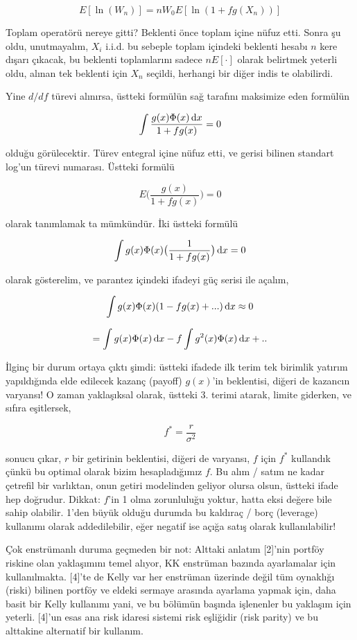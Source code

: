\documentclass[12pt,fleqn]{article}\usepackage{../../common}
\begin{document}
$$ E[\ln(W_n)] = n W_0 E[\ln (1+fg(X_n))]  $$

Toplam operatörü nereye gitti? Beklenti önce toplam içine nüfuz etti. Sonra
şu oldu, unutmayalım, $X_i$ i.i.d. bu sebeple toplam içindeki beklenti
hesabı $n$ kere dışarı çıkacak, bu beklenti toplamlarını sadece $n
E[\cdot]$ olarak belirtmek yeterli oldu, alınan tek beklenti için $X_n$
seçildi, herhangi bir diğer indis te olabilirdi.

Yine $d/df$ türevi alınırsa, üstteki formülün sağ tarafını maksimize eden
formülün 

$$ \int \frac{g(x) \Phi(x) \,\mathrm{d} x}{1 + fg(x)} = 0$$

olduğu görülecektir. Türev entegral içine nüfuz etti, ve gerisi bilinen
standart log'un türevi numarası. Üstteki formülü 

$$ E \bigg( \frac{g(x)}{1+fg(x)} \bigg) = 0$$

olarak tanımlamak ta mümkündür. İki üstteki formülü 

$$ \int g(x) \Phi(x) \big(\frac{1}{1 + fg(x)} \big) \,\mathrm{d} x = 0$$

olarak gösterelim, ve parantez içindeki ifadeyi güç serisi ile açalım, 

$$ \int g(x) \Phi(x) (1 - fg(x) + ...)  \,\mathrm{d} x \approx 0$$

$$ = \int g(x)\Phi(x) \,\mathrm{d} x  - f \int g^2(x)\Phi(x) \,\mathrm{d} x + ..  $$

İlginç bir durum ortaya çıktı şimdi: üstteki ifadede ilk terim tek birimlik
yatırım yapıldığında elde edilecek kazanç (payoff) $g(x)$'in beklentisi,
diğeri de kazancın varyansı! O zaman yaklaşıksal olarak, üstteki 3. terimi
atarak, limite giderken, ve sıfıra eşitlersek,

$$ f^* = \frac{r}{\sigma^2} $$

sonucu çıkar, $r$ bir getirinin beklentisi, diğeri de varyansı, $f$ için
$f^*$ kullandık çünkü bu optimal olarak bizim hesapladığımız $f$. Bu alım /
satım ne kadar çetrefil bir varlıktan, onun getiri modelinden geliyor
olursa olsun, üstteki ifade hep doğrudur. Dikkat: $f$'in 1 olma zorunluluğu
yoktur, hatta eksi değere bile sahip olabilir. 1'den büyük olduğu durumda
bu kaldıraç / borç (leverage) kullanımı olarak addedilebilir, eğer negatif
ise açığa satış olarak kullanılabilir! 

Çok enstrümanlı duruma geçmeden bir not: Alttaki anlatım [2]'nin portföy riskine
olan yaklaşımını temel alıyor, KK enstrüman bazında ayarlamalar için
kullanılmakta. [4]'te de Kelly var her enstrüman üzerinde değil tüm oynaklığı
(riski) bilinen portföy ve eldeki sermaye arasında ayarlama yapmak için, daha
basit bir Kelly kullanımı yani, ve bu bölümün başında işlenenler bu yaklaşım
için yeterli. [4]'un esas ana risk idaresi sistemi risk eşliğidir (risk parity)
ve bu alttakine alternatif bir kullanım. 
\end{document}
